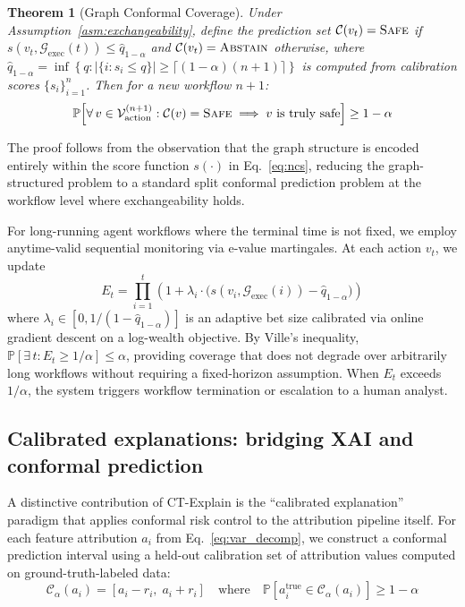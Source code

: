 \documentclass[preprint,review,12pt]{elsarticle}
\newtheorem{theorem}{Theorem}
\newcommand{\Prob}{\mathbb{P}}
\newcommand{\calG}{\mathcal{G}}
\newcommand{\calC}{\mathcal{C}}
\newcommand{\calV}{\mathcal{V}}
\newcommand{\abs}[1]{\left|#1\right|}
\begin{document}
\begin{theorem}[Graph Conformal Coverage]\label{thm:coverage}
Under Assumption~\ref{asm:exchangeability}, define the prediction set $\calC(v_t) = \textsc{Safe}$ if $s(v_t, \calG_{\mathrm{exec}}(t)) \leq \hat{q}_{1-\alpha}$ and $\calC(v_t) = \textsc{Abstain}$ otherwise, where $\hat{q}_{1-\alpha} = \inf\!\left\{q : \abs{\{i : s_i \leq q\}} \geq \lceil(1-\alpha)(n+1)\rceil\right\}$ is computed from calibration scores $\{s_i\}_{i=1}^n$. Then for a new workflow $n+1$:
\begin{equation}
    \Prob\!\left[\forall\, v \in \calV_{\mathrm{action}}^{(n+1)} : \calC(v) = \textsc{Safe} \implies v \text{ is truly safe}\right] \geq 1 - \alpha
\end{equation}
\end{theorem}

The proof follows from the observation that the graph structure is encoded entirely within the score function $s(\cdot)$ in Eq.~\eqref{eq:ncs}, reducing the graph-structured problem to a standard split conformal prediction problem at the workflow level where exchangeability holds.

For long-running agent workflows where the terminal time is not fixed, we employ anytime-valid sequential monitoring via e-value martingales. At each action $v_t$, we update
\begin{equation}\label{eq:evalue}
    E_t = \prod_{i=1}^{t} \!\left(1 + \lambda_i \cdot \big(s(v_i, \calG_{\mathrm{exec}}(i)) - \hat{q}_{1-\alpha}\big)\right)
\end{equation}
where $\lambda_i \in [0, 1/(1 - \hat{q}_{1-\alpha})]$ is an adaptive bet size calibrated via online gradient descent on a log-wealth objective. By Ville's inequality, $\Prob[\exists\, t : E_t \geq 1/\alpha] \leq \alpha$, providing coverage that does not degrade over arbitrarily long workflows without requiring a fixed-horizon assumption. When $E_t$ exceeds $1/\alpha$, the system triggers workflow termination or escalation to a human analyst.

\subsection{Calibrated explanations: bridging XAI and conformal prediction}
\label{subsec:calibrated_explanations}

A distinctive contribution of CT-Explain is the ``calibrated explanation'' paradigm that applies conformal risk control to the attribution pipeline itself. For each feature attribution $a_i$ from Eq.~\eqref{eq:var_decomp}, we construct a conformal prediction interval using a held-out calibration set of attribution values computed on ground-truth-labeled data:
\begin{equation}\label{eq:calibrated_attr}
    \calC_\alpha(a_i) = [a_i - r_i,\; a_i + r_i] \quad \text{where} \quad \Prob[a_i^{\mathrm{true}} \in \calC_\alpha(a_i)] \geq 1 - \alpha
\end{equation}
\end{document}
